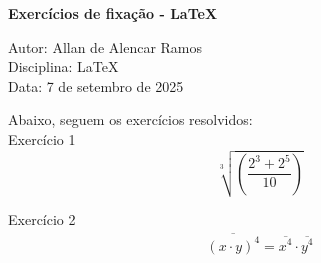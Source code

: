 \documentclass[12pt, a4paper]{article}
\begin{document}
\begin{center}
	\textbf{\large Exercícios de fixação - LaTeX}
\end{center}

\vspace{0.25cm}

\begin{flushleft}
Autor: Allan de Alencar Ramos \\
Disciplina: LaTeX \\
Data: 7 de setembro de 2025
\end{flushleft}

Abaixo, seguem os exercícios resolvidos: \\

Exercício 1 \\
\begin{equation}
\sqrt[3]{ \left(\frac{ 2^{3} + 2^{5} }{10}\right) }
\end{equation}

Exercício 2 \\
\begin{eqnarray}
\overline{ (x \cdot y)^{4} } = \overline{x^{4}} \cdot \overline{y^{4}}
\end{eqnarray}
\end{document}
